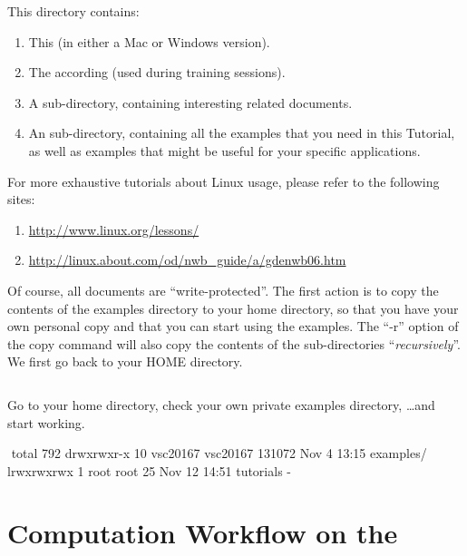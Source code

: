 This directory contains:

\begin{enumerate}
  \item This  (in either a Mac or Windows
    version).
  \item The according  (used during training
    sessions).
  \item A  sub-directory, containing interesting \hpc
    related documents.
  \item An  sub-directory, containing all the
    examples that you need in this Tutorial, as well as examples that might be
    useful for your specific applications.
\end{enumerate}

 For more exhaustive tutorials about Linux usage,
please refer to the following sites:

\begin{enumerate}
  \item \url{http://www.linux.org/lessons/}
  \item \url{http://linux.about.com/od/nwb\_guide/a/gdenwb06.htm}
\end{enumerate}

Of course, all documents are ``write-protected''. The first action is to copy
the contents of the \hpc examples directory to your home directory, so that you
have your own personal copy and that you can start using the examples. The
``-r'' option of the copy command will also copy the contents of the
sub-directories ``\emph{recursively}''.  We first go back to your HOME
directory.

\begin{prompt}
$ %
$ %
\end{prompt}

Go to your home directory, check your own private examples directory, \dots  and start working.

\begin{prompt}
$ %
$ %
total 792
drwxrwxr-x 10 vsc20167 vsc20167 131072 Nov  4 13:15 examples/
lrwxrwxrwx 1  root     root         25 Nov 12 14:51 tutorials -%
\end{prompt}

\section{Computation Workflow on the \hpc}
\label{sec:compuation-workflow-on-the-hpc}

